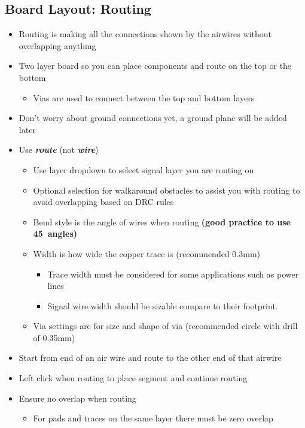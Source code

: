 \documentclass{article}
\begin{document}
\subsection{Board Layout: Routing}
\begin{itemize}
    \item Routing is making all the connections shown by the airwires without overlapping anything
    \item Two layer board so you can place components and route on the top or the bottom
    \begin{itemize}
        \item Vias are used to connect between the top and bottom layers
    \end{itemize}
    \item Don't worry about ground connections yet, a ground plane will be added later
    \item Use \textit{\textbf{route}} (not \textit{\textbf{wire}})
    \begin{itemize}
        \item Use layer dropdown to select signal layer you are routing on
        \item Optional selection for walkaround obstacles to assist you with routing to avoid overlapping based on DRC rules
        \item Bend style is the angle of wires when routing \textbf{(good practice to use 45\degree\ angles)}
        \item Width is how wide the copper trace is (recommended 0.3mm)
        \begin{itemize}
            \item Trace width must be considered for some applications such as power lines
            \item Signal wire width should be sizable compare to their footprint.
        \end{itemize}
        \item Via settings are for size and shape of via (recommended circle with drill of 0.35mm)
    \end{itemize}
    \item Start from end of an air wire and route to the other end of that airwire
    \item Left click when routing to place segment and continue routing
    \item Ensure no overlap when routing
    \begin{itemize}
        \item For pads and traces on the same layer there must be zero overlap

\end{itemize}
\end{itemize}
\end{document}
